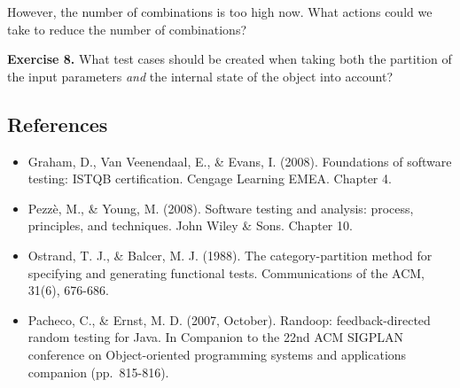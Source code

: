 However, the number of combinations is too high now. What actions could
we take to reduce the number of combinations?

\textbf{Exercise 8.} What test cases should be created when taking both
the partition of the input parameters \emph{and} the internal state of
the object into account?

\begin{Shaded}
\begin{Highlighting}[]
\CommentTok{/**}
\CommentTok{*}
 \CommentTok{*}
\CommentTok{*}\CommentTok{,} 
 \CommentTok{*}
\CommentTok{*}
\CommentTok{*}
\CommentTok{*}\CommentTok{,}
\CommentTok{*}
\CommentTok{*}
\CommentTok{*}\CommentTok{,} 
 \CommentTok{*}
\CommentTok{*}\CommentTok{\textasciigrave{}}\CommentTok{\textasciigrave{}}
\CommentTok{*}
\CommentTok{*} 
\CommentTok{*} 
 \CommentTok{*}
\CommentTok{*/}
  
\NormalTok{\}}
\end{Highlighting}
\end{Shaded}

\hypertarget{references}{%
\subsection{References}\label{references}}

\begin{itemize}
\item
  Graham, D., Van Veenendaal, E., \& Evans, I. (2008). Foundations of
  software testing: ISTQB certification. Cengage Learning EMEA. Chapter
  4.
\item
  Pezzè, M., \& Young, M. (2008). Software testing and analysis:
  process, principles, and techniques. John Wiley \& Sons. Chapter 10.
\item
  Ostrand, T. J., \& Balcer, M. J. (1988). The category-partition method
  for specifying and generating functional tests. Communications of the
  ACM, 31(6), 676-686.
\item
  Pacheco, C., \& Ernst, M. D. (2007, October). Randoop:
  feedback-directed random testing for Java. In Companion to the 22nd
  ACM SIGPLAN conference on Object-oriented programming systems and
  applications companion (pp.~815-816).
\end{itemize}
